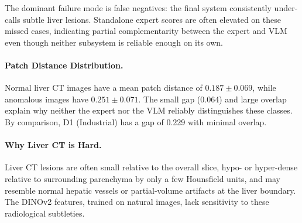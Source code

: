 The dominant failure mode is false negatives: the final system consistently under-calls subtle liver lesions. Standalone expert scores are often elevated on these missed cases, indicating partial complementarity between the expert and VLM even though neither subsystem is reliable enough on its own.

\paragraph{Patch Distance Distribution.}
Normal liver CT images have a mean patch distance of $0.187 \pm 0.069$, while anomalous images have $0.251 \pm 0.071$. The small gap (0.064) and large overlap explain why neither the expert nor the VLM reliably distinguishes these classes. By comparison, D1 (Industrial) has a gap of 0.229 with minimal overlap.

\paragraph{Why Liver CT is Hard.}
Liver CT lesions are often small relative to the overall slice, hypo- or hyper-dense relative to surrounding parenchyma by only a few Hounsfield units, and may resemble normal hepatic vessels or partial-volume artifacts at the liver boundary. The DINOv2 features, trained on natural images, lack sensitivity to these radiological subtleties.

